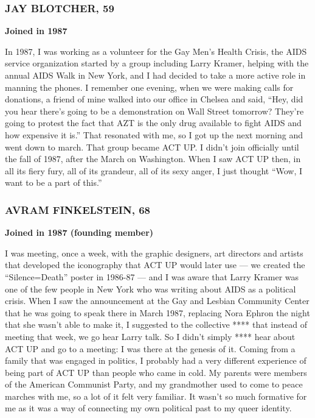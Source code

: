 \hypertarget{jay-blotcher-59}{%
\subsubsection{JAY BLOTCHER, 59}\label{jay-blotcher-59}}

\textbf{Joined in 1987}

In 1987, I was working as a volunteer for the Gay Men's Health Crisis,
the AIDS service organization started by a group including Larry Kramer,
helping with the annual AIDS Walk in New York, and I had decided to take
a more active role in manning the phones. I remember one evening, when
we were making calls for donations, a friend of mine walked into our
office in Chelsea and said, ``Hey, did you hear there's going to be a
demonstration on Wall Street tomorrow? They're going to protest the fact
that AZT is the only drug available to fight AIDS and how expensive it
is.'' That resonated with me, so I got up the next morning and went down
to march. That group became ACT UP. I didn't join officially until the
fall of 1987, after the March on Washington. When I saw ACT UP then, in
all its fiery fury, all of its grandeur, all of its sexy anger, I just
thought ``Wow, I want to be a part of this.''

\hypertarget{avram-finkelstein-68}{%
\subsubsection{AVRAM FINKELSTEIN, 68}\label{avram-finkelstein-68}}

\textbf{Joined in 1987 (founding member)}

I was meeting, once a week, with the graphic designers, art directors
and artists that developed the iconography that ACT UP would later use
--- we created the ``Silence=Death'' poster in 1986-87 --- and I was
aware that Larry Kramer was one of the few people in New York who was
writing about AIDS as a political crisis. When I saw the announcement at
the Gay and Lesbian Community Center that he was going to speak there in
March 1987, replacing Nora Ephron the night that she wasn't able to make
it, I suggested to the collective **** that instead of meeting that
week, we go hear Larry talk. So I didn't simply **** hear about ACT UP
and go to a meeting: I was there at the genesis of it. Coming from a
family that was engaged in politics, I probably had a very different
experience of being part of ACT UP than people who came in cold. My
parents were members of the American Communist Party, and my grandmother
used to come to peace marches with me, so a lot of it felt very
familiar. It wasn't so much formative for me as it was a way of
connecting my own political past to my queer identity.

